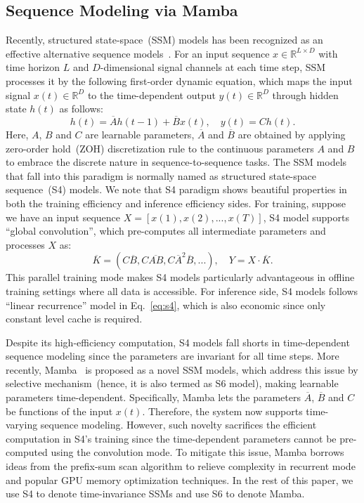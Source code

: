 \documentclass{article}
\theoremstyle{plain}
\theoremstyle{definition}
\theoremstyle{remark}
\begin{document}
\subsection{Sequence Modeling via Mamba}\label{sec:2.2}
Recently, structured state-space~(SSM) models has been recognized as an effective alternative sequence models~\cite{6,ssm-gu,h3,linear-attn,retnet}. For an input sequence $x \in \mathbb{R}^{L \times D}$ with time horizon $L$ and $D$-dimensional signal channels at each time step, SSM processes it by the following first-order dynamic equation, which maps the input signal $x(t) \in \mathbb{R}^D$ to the time-dependent output $y(t) \in \mathbb{R}^D$ through hidden state $h(t)$ as follows:
\begin{equation}\label{eq:s4}
    h(t) = \overline{A} h(t-1) + \overline{B} x(t),\quad y(t) = C h(t).
\end{equation}
Here, $A$, $B$ and $C$ are learnable parameters, $\overline{A}$ and $\overline{B}$ are obtained by applying zero-order hold~(ZOH) discretization rule to the continuous parameters $A$ and $B$ to embrace the discrete nature in sequence-to-sequence tasks. The SSM models that fall into this paradigm is normally named as structured state-space sequence~(S4) models. We note that S4 paradigm shows beautiful properties in both the training efficiency and inference efficiency sides. For training, suppose we have an input sequence $X = [x(1),x(2),...,x(T)]$, S4 model supports ``global convolution'', which pre-computes all intermediate parameters and processes $X$ as:
\begin{equation}\label{eq:s4-kernal}
    \overline{K} = (C\overline{B},C\overline{AB},C\overline{A}^2\overline{B},...),\quad Y = X\cdot \overline{K}.
\end{equation}
This parallel training mode makes S4 models particularly advantageous in offline training settings where all data is accessible. For inference side, S4 models follows ``linear recurrence'' model in Eq.~\ref{eq:s4}, which is also economic since only constant level cache is required.

Despite its high-efficiency computation, S4 models fall shorts in time-dependent sequence modeling since the parameters are invariant for all time steps. More recently, Mamba~\cite{mamba,mamba2} is proposed as a novel SSM models, which address this issue by selective mechanism~(hence, it is also termed as S6 model), making learnable parameters time-dependent. Specifically, Mamba lets the parameters $\overline{A}$, $\overline{B}$ and $C$ be functions of the input $x(t)$. Therefore, the system now supports time-varying sequence modeling. However, such novelty sacrifices the efficient computation in S4's training since the time-dependent parameters cannot be pre-computed using the convolution mode. To mitigate this issue, Mamba borrows ideas from the prefix-sum scan algorithm to relieve complexity in recurrent mode and popular GPU memory optimization techniques. In the rest of this paper, we use S4 to denote time-invariance SSMs and use S6 to denote Mamba. 
\end{document}
